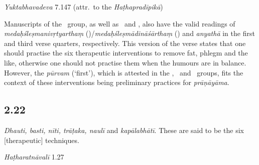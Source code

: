 \begin{ekdosis}
\begin{testimonia}[hp02_021]
\emph{Yuktabhavadeva} 7.147 (attr.~to the \emph{Haṭhapradīpikā})

\begin{versinnote}
\end{versinnote}

\end{testimonia}

\begin{philcomm}[hp02_021]
Manuscripts of the \textdelta\ group, as well as \etaTwo\ and \zetaThree, also have the valid readings of \emph{medaḥśleṣmanivṛtyarthaṃ} (\deltaOne\deltaTwo\zetaThree)/\emph{medaḥśleṣmādināśārthaṃ} (\etaTwo) and \emph{anyathā} in the first and third verse quarters, respectively. This version of the verse states that one should practise the six therapeutic interventions to remove fat, phlegm and the like, otherwise one should not practise them when the humours are in balance. However, the \emph{pūrvam} (`first'), which is attested in the \textalpha, \textbeta\ and \textgamma\ groups, fits the context of these interventions being preliminary practices for \emph{prāṇāyāma}.
\end{philcomm}

\subsection*{2.22}
\begin{translation}[hp02_022]
\emph{Dhauti, basti, nīti, trāṭaka, naulī} and \emph{kapālabhātī}. These are said to be the six [therapeutic] techniques.%
\end{translation}

\begin{sources}[hp02_022]
\end{sources}

\begin{testimonia}[hp02_022]
\emph{Haṭharatnāvalī} 1.27

\begin{versinnote}
\end{versinnote}


\end{testimonia}
\end{ekdosis}
